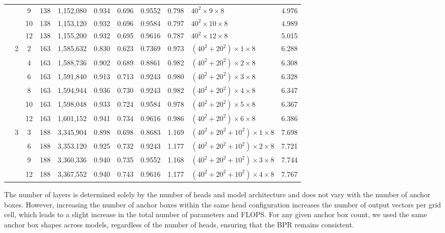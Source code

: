 \documentclass[journal,twoside,web]{ieeecolor}
\begin{document}
\begin{table}[!t]
{\begin{tabular}{l c c c r r r r r l r}
         & & 9 & 138 & 1,152,080 & 0.934 & 0.696 & 0.9552 & 0.798 & $40^2 \times 9 \times 8$ & 4.976 \\
         & & 10 & 138 & 1,153,120 & 0.932 & 0.696 & 0.9584 & 0.797 & $40^2 \times 10 \times 8$ & 4.989 \\
         & & 12 & 138 & 1,155,200 & 0.932 & 0.695 & 0.9616 & 0.787 & $40^2 \times 12 \times 8$ & 5.015 \\
        \cmidrule(r){2-11} %
         & \multirow{6}{*}{2} & 2 & 163 & 1,585,632 & 0.830 & 0.623 & 0.7369 & 0.973 & $(40^2+20^2) \times 1 \times 8$ & 6.288 \\
         & & 4 & 163 & 1,588,736 & 0.902 & 0.689 & 0.8861 & 0.982 & $(40^2+20^2) \times 2 \times 8$ & 6.308 \\
         & & 6 & 163 & 1,591,840 & 0.913 & 0.713 & 0.9243 & 0.980 & $(40^2+20^2) \times 3 \times 8$ & 6.328 \\
         & & 8 & 163 & 1,594,944 & 0.936 & 0.730 & 0.9243 & 0.982 & $(40^2+20^2) \times 4 \times 8$ & 6.347 \\
         & & 10 & 163 & 1,598,048 & 0.933 & 0.724 & 0.9584 & 0.978 & $(40^2+20^2) \times 5 \times 8$ & 6.367 \\
         & & 12 & 163 & 1,601,152 & 0.941 & 0.734 & 0.9616 & 0.986 & $(40^2+20^2) \times 6 \times 8$ & 6.386 \\
        \cmidrule(r){2-11} %
         & \multirow{4}{*}{3} & 3 & 188 & 3,345,904 & 0.898 & 0.698 & 0.8683 & 1.169 & $(40^2+20^2+10^2) \times 1 \times 8$ & 7.698 \\
         & & 6 & 188 & 3,353,120 & 0.925 & 0.732 & 0.9243 & 1.177 & $(40^2+20^2+10^2) \times 2 \times 8$ & 7.721 \\
         & & 9 & 188 & 3,360,336 & 0.940 & 0.735 & 0.9552 & 1.168 & $(40^2+20^2+10^2) \times 3 \times 8$ & 7.744 \\
         & & 12 & 188 & 3,367,552 & 0.940 & 0.743 & 0.9616 & 1.177 & $(40^2+20^2+10^2) \times 4 \times 8$ & 7.767 \\
        \bottomrule
        \end{tabular}
    }
\end{table}

The number of layers is determined solely by the number of heads and model architecture and does not vary with the number of anchor boxes. However, increasing the number of anchor boxes within the same head configuration increases the number of output vectors per grid cell, which leads to a slight increase in the total number of parameters and \ac{FLOPS}. For any given anchor box count, we used the same anchor box shapes across models, regardless of the number of heads, ensuring that the \ac{BPR} remains consistent.
\end{document}
